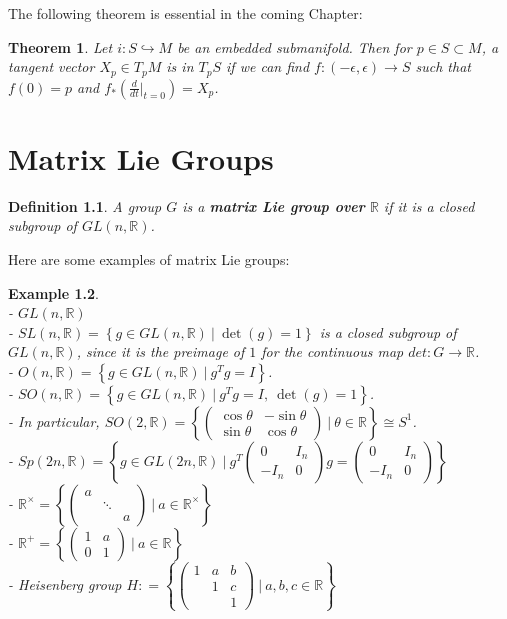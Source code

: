 \documentclass[11pt]{book}
\newtheorem{theorem}{Theorem}[section]
\newtheorem{example}[theorem]{Example}
\newtheorem{definition}[theorem]{Definition}
\newcommand{\bb}[1]{\mathbb{#1}}
\begin{document}
The following theorem is essential in the coming Chapter:
\begin{theorem} \label{embtangent}
Let $i: S \hookrightarrow M$ be an embedded submanifold. Then for $p \in S \subset M$, a tangent vector $X_p \in T_pM$ is in $T_pS$ if we can find $f: (-\epsilon,\epsilon) \to S$ such that $f(0) = p$ and $f_*(\frac{d}{dt}  \Big|_{t=0}) = X_p$.
\end{theorem}

\newpage
\chapter{Matrix Lie Groups}
\begin{definition}
A group $G$ is a \textbf{matrix Lie group over} $\bb{R}$ if it is a closed subgroup of $GL(n,\bb{R})$.
\end{definition}
Here are some examples of matrix Lie groups:
\begin{example} \mbox{}\\
- $GL(n,\bb{R})$\\
- $SL(n,\bb{R}) = \left\{g \in GL(n,\bb{R})\ \Big|\ \det(g) = 1 \right\}$ is a closed subgroup of $GL(n,\bb{R})$, since it is the preimage of $1$ for the continuous map $det: G  \to \bb{R}$.\\
- $O(n,\bb{R}) = \left\{g \in GL(n,\bb{R})\ \Big|\ g^Tg = I \right\}$.\\
- $SO(n,\bb{R}) = \left\{g \in GL(n,\bb{R})\ \Big|\ g^Tg = I,\ \det(g) = 1 \right\}$.\\
- In particular, $SO(2,\bb{R}) = \left\{\left( \begin{array}{cc}
\cos \theta & -\sin \theta \\
\sin \theta & \cos \theta \end{array} \right)\ \Big|\ \theta \in \bb{R} \right\} \cong S^1$.\\
- $Sp(2n,\bb{R})= \left\{g \in GL(2n,\bb{R})\ \Big|\ g^T\left( \begin{array}{cc}
0 & I_n \\
-I_n & 0 \end{array} \right)g = \left( \begin{array}{cc}
0 & I_n \\
-I_n & 0 \end{array} \right) \right\}$\\
- $\bb{R}^{\times} = \left\{ \left( \begin{array}{ccc}
a & & \\
 & \ddots &  \\
& & a \end{array} \right) \ \Big|\ a \in \bb{R}^{\times} \right\}$\\
- $\bb{R}^{+} = \left\{\left( \begin{array}{cc}
1 & a \\
0 & 1 \end{array} \right)\ \Big|\ a \in \bb{R} \right\}$\\
- Heisenberg group $H : = \left\{ \left( \begin{array}{ccc}
1 & a & b \\
 & 1 & c \\
& & 1 \end{array} \right)\ \Big|\ a, b,c \in \bb{R} \right\}$
\end{example}
\end{document}
